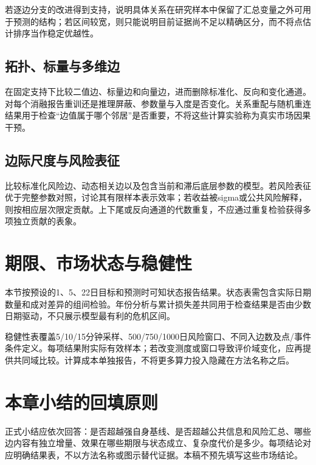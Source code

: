 
若逐边分支的改进得到支持，说明具体关系在研究样本中保留了汇总变量之外可用于预测的结构；若区间较宽，则只能说明目前证据尚不足以精确区分，而不将点估计排序当作稳定优越性。

\subsection{拓扑、标量与多维边}
在固定支持下比较二值边、标量边和向量边，进而删除标准化、反向和变化通道。对每个消融报告重训还是推理屏蔽、参数量与入度是否变化。关系重配与随机重连结果用于检查“边值属于哪个邻居”是否重要，不将这些计算实验称为真实市场因果干预。


\subsection{边际尺度与风险表征}
比较标准化风险边、动态相关边以及包含当前和滞后底层参数的模型。若风险表征优于完整参数对照，讨论其有限样本表示效率；若收益被sigma或公共风险解释，则按相应层次限定贡献。上下尾或反向通道的代数重复，不应通过重复检验获得多项独立贡献的表象。

\section{期限、市场状态与稳健性}
本节按预设的1、5、22日目标和预测时可知状态报告结果。状态表需包含实际日期数量和成对差异的组间检验。年份分析与累计损失差共同用于检查结果是否由少数日期驱动，不只展示模型最有利的危机区间。

稳健性表覆盖5/10/15分钟采样、500/750/1000日风险窗口、不同入边数及点/事件条件定义。每项结果附实际有效样本；若改变测度或窗口导致评价域变化，应再提供共同域比较。计算成本单独报告，不将更多算力投入隐藏在方法名称之后。


\section{本章小结的回填原则}
正式小结应依次回答：是否超越强自身基线、是否超越公共信息和风险汇总、哪些边内容有独立增量、效果在哪些期限与状态成立、复杂度代价是多少。每项结论对应明确结果表，不以方法名称或图示替代证据。本稿不预先填写这些市场结论。
